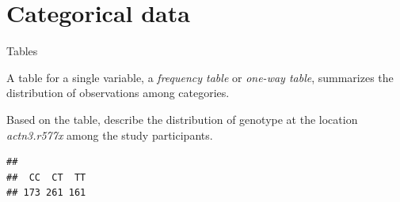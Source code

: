 \documentclass[
  ignorenonframetext,
]{beamer}
\newenvironment{Shaded}{\begin{snugshade}}{\end{snugshade}}
\newcommand{\KeywordTok}[1]{\textcolor[rgb]{0.13,0.29,0.53}{\textbf{#1}}}
\newcommand{\NormalTok}[1]{#1}
\newcommand{\OperatorTok}[1]{\textcolor[rgb]{0.81,0.36,0.00}{\textbf{#1}}}
\begin{document}
\hypertarget{categorical-data}{%
\section{Categorical data}\label{categorical-data}}

\begin{frame}[fragile]{Tables}
\protect\hypertarget{tables}{}

A table for a single variable, a \emph{frequency table} or \emph{one-way
table}, summarizes the distribution of observations among categories.

Based on the table, describe the distribution of genotype at the
location \emph{actn3.r577x} among the study participants.

\small

\scriptsize

\begin{Shaded}
\end{Shaded}

\begin{verbatim}
## 
##  CC  CT  TT 
## 173 261 161
\end{verbatim}

\normalsize

\end{frame}
\end{document}

